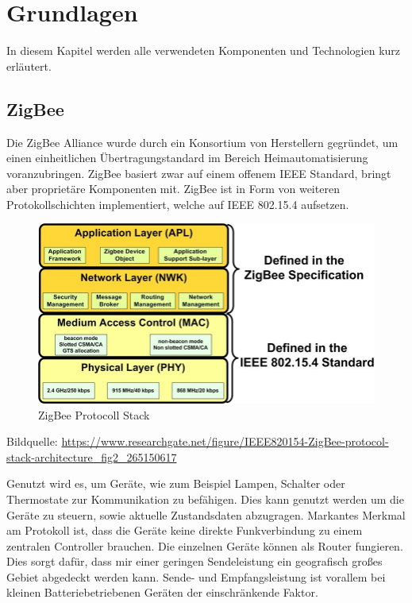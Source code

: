 \chapter{Grundlagen}

In diesem Kapitel werden alle verwendeten Komponenten und Technologien kurz erläutert.

\section{ZigBee}

Die ZigBee Alliance wurde durch ein Konsortium von Herstellern gegründet, um einen einheitlichen Übertragungstandard
im Bereich Heimautomatisierung voranzubringen. ZigBee basiert zwar auf einem offenem IEEE Standard, bringt aber proprietäre Komponenten mit.
ZigBee ist in Form von weiteren Protokollschichten implementiert, welche auf IEEE 802.15.4 aufsetzen.

\begin{figure}[H]
  \centering
  \includegraphics[width=1\textwidth]{media/Zigbee Stack.jpg}
  \caption{ZigBee Protocoll Stack}
\end{figure}

Bildquelle: \url{https://www.researchgate.net/figure/IEEE820154-ZigBee-protocol-stack-architecture_fig2_265150617}


Genutzt wird es, um Geräte, wie zum Beispiel Lampen, Schalter oder Thermostate
zur Kommunikation zu befähigen. Dies kann genutzt werden um die Geräte zu steuern, sowie aktuelle Zustandsdaten abzugragen. 
Markantes Merkmal am Protokoll ist, dass die Geräte keine direkte Funkverbindung
zu einem zentralen Controller brauchen. Die einzelnen Geräte können als Router fungieren. Dies sorgt dafür,
dass mir einer geringen Sendeleistung ein geografisch großes Gebiet abgedeckt werden kann. Sende- und Empfangsleistung
ist vorallem bei kleinen Batteriebetriebenen Geräten der einschränkende Faktor.


